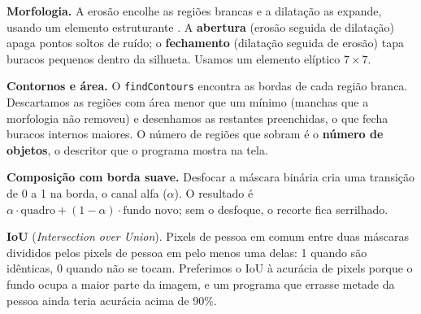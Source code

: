 \textbf{Morfologia.} A erosão encolhe as regiões brancas e a dilatação
as expande, usando um elemento estruturante \citep{gonzalez2010}. A
\textbf{abertura} (erosão seguida de dilatação) apaga pontos soltos de
ruído; o \textbf{fechamento} (dilatação seguida de erosão) tapa buracos
pequenos dentro da silhueta. Usamos um elemento elíptico $7 \times 7$.

\textbf{Contornos e área.} O \texttt{findContours} encontra as bordas de
cada região branca. Descartamos as regiões com área menor que um mínimo
(manchas que a morfologia não removeu) e desenhamos as restantes
preenchidas, o que fecha buracos internos maiores. O número de regiões
que sobram é o \textbf{número de objetos}, o descritor que o programa
mostra na tela.

\textbf{Composição com borda suave.} Desfocar a máscara binária cria uma
transição de 0 a 1 na borda, o canal alfa ($\alpha$). O resultado é
$\alpha \cdot \text{quadro} + (1-\alpha) \cdot \text{fundo novo}$; sem o
desfoque, o recorte fica serrilhado.

\textbf{IoU} (\textit{Intersection over Union}). Pixels de pessoa em
comum entre duas máscaras divididos pelos pixels de pessoa em pelo
menos uma delas: 1 quando são idênticas, 0 quando não se tocam.
Preferimos o IoU à acurácia de pixels porque o fundo ocupa a maior
parte da imagem, e um programa que errasse metade da pessoa ainda teria
acurácia acima de 90\%.
